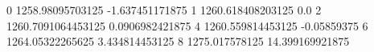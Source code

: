 0 1258.98095703125 -1.637451171875
1 1260.618408203125 0.0
2 1260.7091064453125 0.0906982421875
4 1260.559814453125 -0.05859375
6 1264.05322265625 3.434814453125
8 1275.017578125 14.399169921875
